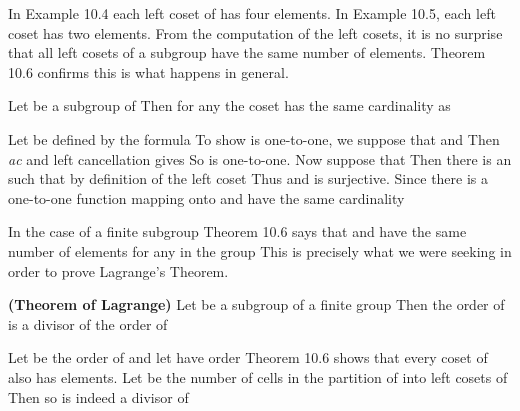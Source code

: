 \documentclass[11pt,oneside]{article}
\begin{document}
\begin{BookBody}


\noindent In Example 10.4 each left coset of  has four elements. In Example 10.5, each left coset has two elements. From the computation of the left cosets, it is no surprise that all left cosets of a subgroup have the same number of elements. Theorem 10.6 confirms this is what happens in general.

 Let  be a subgroup of  Then for any  the coset  has the same cardinality as 

 Let  be defined by the formula  To show  is one-to-one, we suppose that  and  Then  \textit{ac} and left cancellation gives  So  is one-to-one. Now suppose that  Then there is an  such that  by definition of the left coset  Thus  and  is surjective. Since there is a one-to-one function mapping  onto  and  have the same cardinality\BookEnd{\blacklozenge}

In the case of a finite subgroup  Theorem 10.6 says that  and  have the same number of elements for any  in the group  This is precisely what we were seeking in order to prove Lagrange’s Theorem.

 \textbf{(Theorem of Lagrange)} Let  be a subgroup of a finite group  Then the order of  is a divisor of the order of 

 Let  be the order of  and let  have order  Theorem 10.6 shows that every coset of  also has  elements. Let  be the number of cells in the partition of  into left cosets of  Then  so  is indeed a divisor of \BookEnd{\blacklozenge}


\end{BookBody}
\end{document}
